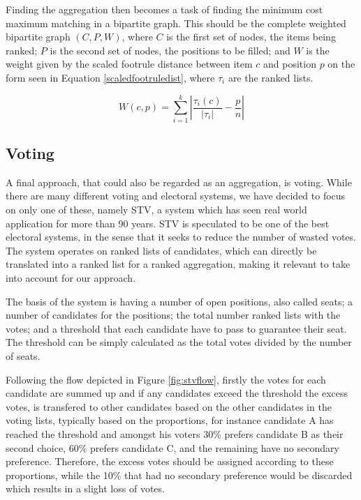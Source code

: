 Finding the aggregation then becomes a task of finding the minimum cost maximum matching in a bipartite graph. This should be the complete weighted bipartite graph $(C, P, W)$, where $C$ is the first set of nodes, the items being ranked; $P$ is the second set of nodes, the positions to be filled; and $W$ is the weight given by the scaled footrule distance between item $c$ and position $p$ on the form seen in Equation \ref{scaledfootruledist}, where $\tau_{i}$ are the ranked lists.

\begin{equation} \label{scaledfootruledist}
	W(c,p) = \sum_{i=1}^{k} \left | \frac{\tau_{i}(c)}{\left |\tau_{i}  \right |} - \frac{p}{n} \right |
\end{equation}

\subsection{Voting} \label{sec:stv}
A final approach, that could also be regarded as an aggregation, is voting. While there are many different voting and electoral systems, we have decided to focus on only one of these, namely STV, a system which has seen real world application for more than 90 years\cite{stvireland}.
STV is speculated to be one of the best electoral systems, in the sense that it seeks to reduce the number of wasted votes. The system operates on ranked lists of candidates, which can directly be translated into a ranked list for a ranked aggregation, making it relevant to take into account for our approach.

The basis of the system is having a number of open positions, also called seats; a number of candidates for the positions; the total number ranked lists with the votes; and a threshold that each candidate have to pass to guarantee their seat. The threshold can be simply calculated as the total votes divided by the number of seats\cite{stv}.

Following the flow depicted in Figure \ref{fig:stvflow}, firstly the votes for each candidate are summed up and if any candidates exceed the threshold the excess votes, is transfered to other candidates based on the other candidates in the voting lists, typically based on the proportions, for instance candidate A has reached the threshold and amongst his voters 30\% prefers candidate B as their second choice, 60\% prefers candidate C, and the remaining have no secondary preference. Therefore, the excess votes should be assigned according to these proportions, while the 10\% that had no secondary preference would be discarded which results in a slight loss of votes.

